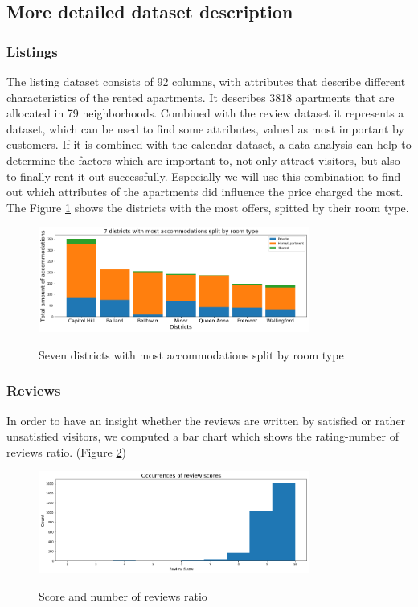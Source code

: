 \documentclass[journal]{IEEEtran}
\begin{document}
\subsection {More detailed dataset description}
\noindent \subsubsection{Listings}  The listing dataset consists of 92 columns, with attributes that describe different characteristics of the rented apartments. It describes 3818 apartments that are allocated in 79 neighborhoods. Combined with the review dataset it represents a dataset, which can be used to find some attributes, valued as most important by customers. If it is combined with the calendar dataset, a data analysis can help to determine the factors which are important to, not only attract visitors, but also to finally rent it out successfully. Especially we will use this combination to find out which attributes of the apartments did influence the price charged the most. The Figure \ref{districts_room_types} shows the districts with the most offers, spitted by their room type.
%
\begin{figure}
  \begin{center}
  \includegraphics[width=3.5in]{photo/4_most_acc_split_by_roomtype.png}\\
  \caption{Seven districts with most accommodations split by room type}\label{districts_room_types}
  \end{center}
\end{figure}
\subsubsection{Reviews}
%
In order to have an insight whether the reviews are written by satisfied or rather unsatisfied visitors, we computed a bar chart which shows the rating-number of reviews ratio. (Figure \ref{score_reviews_ratio})
%
\begin{figure}
  \begin{center}
  \includegraphics[width=3.5in]{photo/2_1_occurences_of_review_scores.png}\\
  \caption{Score and number of reviews ratio}\label{score_reviews_ratio}
  \end{center}
\end{figure}
%
\end{document}
